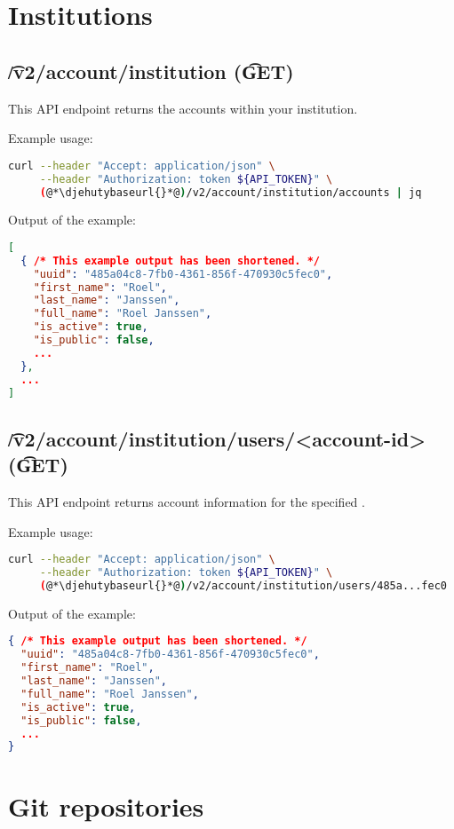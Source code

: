 \section{Institutions}

\subsection{\t{/v2/account/institution} (\t{GET})}

  This API endpoint returns the accounts within your institution.

  Example usage:
\begin{lstlisting}[language=bash]
curl --header "Accept: application/json" \
     --header "Authorization: token ${API_TOKEN}" \
     (@*\djehutybaseurl{}*@)/v2/account/institution/accounts | jq
\end{lstlisting}

  Output of the example:
\begin{lstlisting}[language=JSON]
[
  { /* This example output has been shortened. */
    "uuid": "485a04c8-7fb0-4361-856f-470930c5fec0",
    "first_name": "Roel",
    "last_name": "Janssen",
    "full_name": "Roel Janssen",
    "is_active": true,
    "is_public": false,
    ...
  },
  ...
]
\end{lstlisting}

\subsection{\t{/v2/account/institution/users/<account-id>} (\t{GET})}

  This API endpoint returns account information for the
  specified .

  Example usage:
\begin{lstlisting}[language=bash]
curl --header "Accept: application/json" \
     --header "Authorization: token ${API_TOKEN}" \
     (@*\djehutybaseurl{}*@)/v2/account/institution/users/485a...fec0 | jq
\end{lstlisting}

  Output of the example:
\begin{lstlisting}[language=JSON]
{ /* This example output has been shortened. */
  "uuid": "485a04c8-7fb0-4361-856f-470930c5fec0",
  "first_name": "Roel",
  "last_name": "Janssen",
  "full_name": "Roel Janssen",
  "is_active": true,
  "is_public": false,
  ...
}
\end{lstlisting}

\section{Git repositories}

